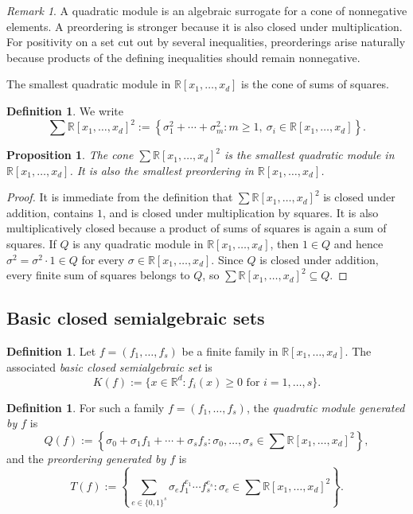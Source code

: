 \documentclass[11pt]{amsart}
\numberwithin{equation}{section}
\newtheorem{proposition}[theorem]{Proposition}
\theoremstyle{definition}
\newtheorem{definition}[theorem]{Definition}
\theoremstyle{remark}
\newtheorem{remark}[theorem]{Remark}
\newcommand{\R}{\mathbb{R}}
\newcommand{\Rxd}{\R[x_1,\dots,x_d]}
\newcommand{\sos}{\sum \R[x_1,\dots,x_d]^2}
\newcommand{\1}{\mathbf{1}}
\begin{document}
\begin{remark}
A quadratic module is an algebraic surrogate for a cone of nonnegative elements. A preordering is stronger because it is also closed under multiplication. For positivity on a set cut out by several inequalities, preorderings arise naturally because products of the defining inequalities should remain nonnegative.
\end{remark}

The smallest quadratic module in \(\Rxd\) is the cone of sums of squares.

\begin{definition}
We write
\[
\sos:=\left\{\sigma_1^2+\cdots+\sigma_m^2: m\ge 1,\ \sigma_i\in\Rxd\right\}.
\]
\end{definition}

\begin{proposition}
The cone \(\sos\) is the smallest quadratic module in \(\Rxd\). It is also the smallest preordering in \(\Rxd\).
\end{proposition}

\begin{proof}
It is immediate from the definition that \(\sos\) is closed under addition, contains \(1\), and is closed under multiplication by squares. It is also multiplicatively closed because a product of sums of squares is again a sum of squares. If \(Q\) is any quadratic module in \(\Rxd\), then \(1\in Q\) and hence \(\sigma^2=\sigma^2\cdot 1\in Q\) for every \(\sigma\in\Rxd\). Since \(Q\) is closed under addition, every finite sum of squares belongs to \(Q\), so \(\sos\subseteq Q\).
\end{proof}

\subsection{Basic closed semialgebraic sets}

\begin{definition}
Let \(f=(f_1,\dots,f_s)\) be a finite family in \(\Rxd\). The associated \emph{basic closed semialgebraic set} is
\[
K(f):=\{x\in\R^d: f_i(x)\ge 0\text{ for }i=1,\dots,s\}.
\]
\end{definition}

\begin{definition}
For such a family \(f=(f_1,\dots,f_s)\), the \emph{quadratic module generated by \(f\)} is
\[
Q(f):=\left\{\sigma_0+\sigma_1f_1+\cdots+\sigma_sf_s: \sigma_0,\dots,\sigma_s\in\sos\right\},
\]
and the \emph{preordering generated by \(f\)} is
\[
T(f):=\left\{\sum_{e\in\{0,1\}^s}\sigma_ef_1^{e_1}\cdots f_s^{e_s}:\sigma_e\in\sos\right\}.
\]
\end{definition}
\end{document}

